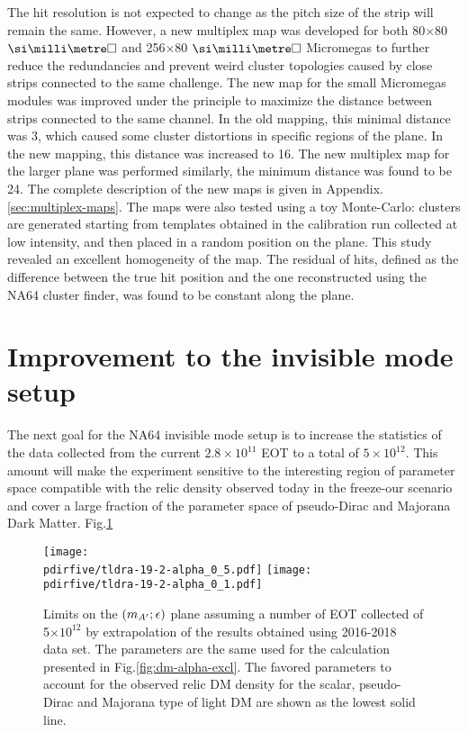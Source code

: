 The hit resolution is not expected to change as the pitch size of the strip will remain the same. However, a new multiplex map was developed for both 80$\times$80 $\mms$ and 256$\times$80 $\mms$ Micromegas to further reduce the redundancies and prevent weird cluster topologies caused by close strips connected to the same challenge. The new map for the small Micromegas modules was improved under the principle to maximize the distance between strips connected to the same channel. In the old mapping, this minimal distance was 3, which caused some cluster distortions in specific regions of the plane. In the new mapping, this distance was increased to 16. The new multiplex map for the larger plane was performed similarly, the minimum distance was found to be 24. The complete description of the new maps is given in Appendix.\ref{sec:multiplex-maps}. The maps were also tested using a toy Monte-Carlo: clusters are generated starting from templates obtained in the calibration run collected at low intensity, and then placed in a random position on the plane. This study revealed an excellent homogeneity of the map. The residual of hits, defined as the difference between the true hit position and the one reconstructed using the NA64 cluster finder, was found to be constant along the plane.



\section{Improvement to the invisible mode setup}
\label{ch5:sec:new-invismode-setup}

The next goal for the NA64 invisible mode setup is to increase the statistics of the data collected from the current $2.8 \times 10^{11}$ EOT to a total of $5 \times 10^{12}$. This amount will make the experiment sensitive to the interesting region of parameter space compatible with the relic density observed today in the freeze-our scenario and cover a large fraction of the parameter space of pseudo-Dirac and Majorana Dark Matter. Fig.\ref{fig:dm-sens-proj}

\begin{figure}[bht!]
  \centering
  \texttt{[image: \\pdirfive/tldra-19-2-alpha\_0\_5.pdf]}
  \texttt{[image: \\pdirfive/tldra-19-2-alpha\_0\_1.pdf]}
  \caption[sensitivity projection for invisible mode 2021]{Limits on the $(m_{A'};\epsilon)$ plane assuming a number of EOT collected of 5$\times 10^{12}$ by extrapolation of the results obtained using 2016-2018 data set. The parameters are the same used for the calculation presented in Fig.\ref{fig:dm-alpha-excl}. The favored parameters to account for the observed relic DM density for the scalar, pseudo-Dirac and Majorana type of light DM are shown as the lowest solid line.}
  \label{fig:dm-sens-proj}
\end{figure}


